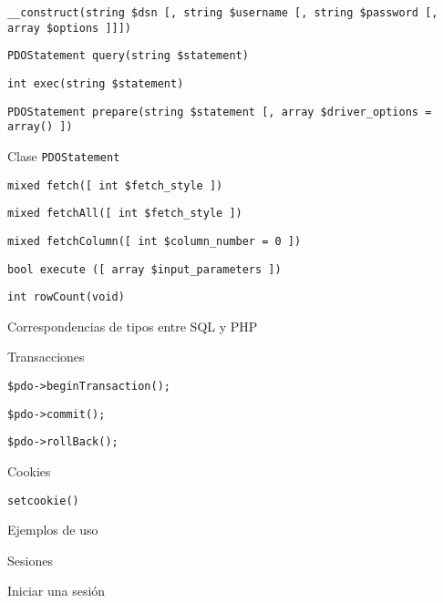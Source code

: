\begin{longenum}
\begin{longenum}
\begin{longenum}
            \begin{longenum}
                \item \texttt{\_\_construct(string \$dsn [, string \$username [, string \$password [, array \$options ]]])}
                \item \texttt{PDOStatement query(string \$statement)}
                \item \texttt{int exec(string \$statement)}
                \item \texttt{PDOStatement prepare(string \$statement [, array \$driver\_options = array() ])}
            \end{longenum}
            \item Clase \texttt{PDOStatement}
            \begin{longenum}
                \item \texttt{mixed fetch([ int \$fetch\_style ])}
                \item \texttt{mixed fetchAll([ int \$fetch\_style ])}
                \item \texttt{mixed fetchColumn([ int \$column\_number = 0 ])}
                \item \texttt{bool execute ([ array \$input\_parameters ])}
                \item \texttt{int rowCount(void)}
            \end{longenum}
            \item Correspondencias de tipos entre SQL y PHP
            \item Transacciones
            \begin{longenum}
                \item \texttt{\$pdo->beginTransaction();}
                \item \texttt{\$pdo->commit();}
                \item \texttt{\$pdo->rollBack();}
            \end{longenum}
        \end{longenum}
        \item Cookies
        \begin{longenum}
            \item \texttt{setcookie()}
            \item Ejemplos de uso
        \end{longenum}
        \item Sesiones
        \begin{longenum}
            \item Iniciar una sesión

\end{longenum}
\end{longenum}
\end{longenum}
